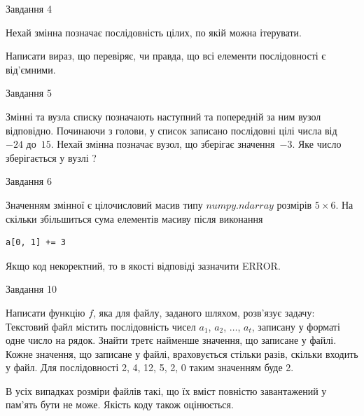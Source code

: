 \documentclass[12pt, ukrainian]{article}
\begin{document}
{               
{\begin{center}Завдання {4}\end{center}}
\vspace{-6mm}
Нехай змінна  позначає послідовність цілих, по якій можна ітерувати.

Написати вираз, що перевіряє, чи правда, що всі елементи послідовності є від’ємни\-ми.\par

\vspace{10mm}
               
{\begin{center}Завдання {5}\end{center}}
\vspace{-6mm}
Змінні  та  вузла списку позначають наступний та попередній за ним вузол відповідно. Починаючи з голови, у список записано послідовні цілі числа від~$-24$ до~$15$. Нехай змінна  позначає вузол, що зберігає значення~$-3$.
Яке число зберігається у вузлі  ?\par

               
{\begin{center}Завдання {6}\end{center}}
\vspace{-6mm}
Значенням змінної  є цілочисловий масив типу $numpy.ndarray$ розмірів $5{\times}6$. На скільки збільшиться сума елементів масиву  після виконання
\begin{verbatim}
a[0, 1] += 3
\end{verbatim}


Якщо код некоректний, то в якості відповіді зазначити ERROR.\par

               
{\begin{center}Завдання {10}\end{center}}
\vspace{-6mm}

Написати функцію $f$, яка для файлу, заданого шляхом, розв’язує задачу:\\ Текстовий файл містить послідовність чисел $a_1$, $a_2$, $\ldots$, $a_t$, записану у форматі одне число на рядок. Знайти третє найменше значення, що записане у файлі. Кожне значення, що записане у файлі, враховується стільки разів, скільки входить у файл. Для послідовності 2, 4, 12, 5, 2, 0 таким значенням буде 2.

В усіх випадках розміри файлів такі, що їх вміст повністю завантажений у пам'ять бути не може. Якість коду також оцінюється.



}
\end{document}
